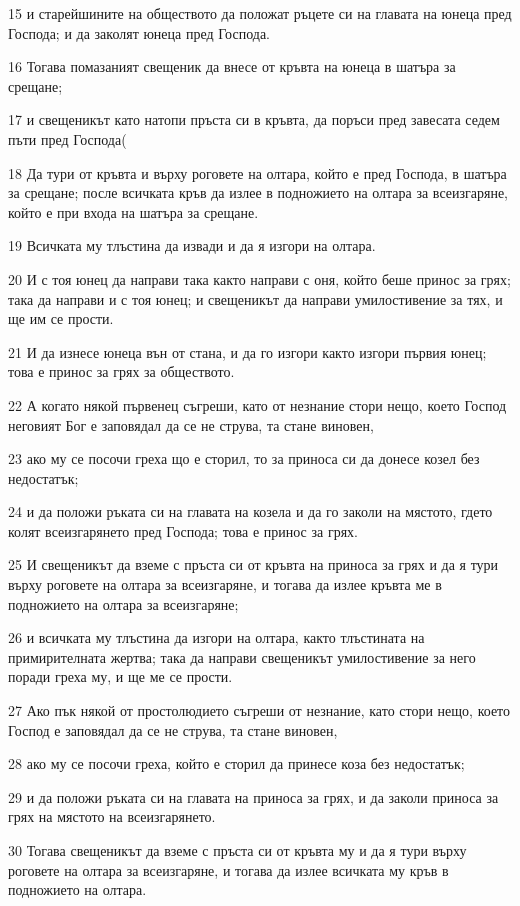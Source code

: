 \par 15 и старейшините на обществото да положат ръцете си на главата на юнеца пред Господа; и да заколят юнеца пред Господа.
\par 16 Тогава помазаният свещеник да внесе от кръвта на юнеца в шатъра за срещане;
\par 17 и свещеникът като натопи пръста си в кръвта, да поръси пред завесата седем пъти пред Господа(
\par 18 Да тури от кръвта и върху роговете на олтара, който е пред Господа, в шатъра за срещане; после всичката кръв да излее в подножието на олтара за всеизгаряне, който е при входа на шатъра за срещане.
\par 19 Всичката му тлъстина да извади и да я изгори на олтара.
\par 20 И с тоя юнец да направи така както направи с оня, който беше принос за грях; така да направи и с тоя юнец; и свещеникът да направи умилостивение за тях, и ще им се прости.
\par 21 И да изнесе юнеца вън от стана, и да го изгори както изгори първия юнец; това е принос за грях за обществото.
\par 22 А когато някой първенец съгреши, като от незнание стори нещо, което Господ неговият Бог е заповядал да се не струва, та стане виновен,
\par 23 ако му се посочи греха що е сторил, то за приноса си да донесе козел без недостатък;
\par 24 и да положи ръката си на главата на козела и да го заколи на мястото, гдето колят всеизгарянето пред Господа; това е принос за грях.
\par 25 И свещеникът да вземе с пръста си от кръвта на приноса за грях и да я тури върху роговете на олтара за всеизгаряне, и тогава да излее кръвта ме в подножието на олтара за всеизгаряне;
\par 26 и всичката му тлъстина да изгори на олтара, както тлъстината на примирителната жертва; така да направи свещеникът умилостивение за него поради греха му, и ще ме се прости.
\par 27 Ако пък някой от простолюдието съгреши от незнание, като стори нещо, което Господ е заповядал да се не струва, та стане виновен,
\par 28 ако му се посочи греха, който е сторил да принесе коза без недостатък;
\par 29 и да положи ръката си на главата на приноса за грях, и да заколи приноса за грях на мястото на всеизгарянето.
\par 30 Тогава свещеникът да вземе с пръста си от кръвта му и да я тури върху роговете на олтара за всеизгаряне, и тогава да излее всичката му кръв в подножието на олтара.
